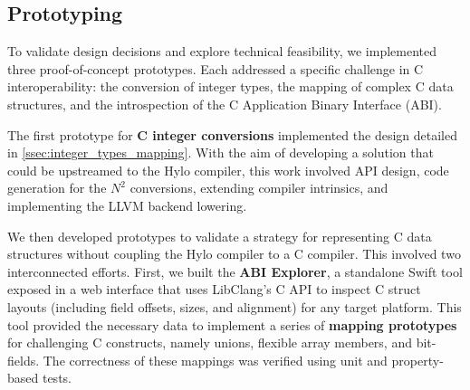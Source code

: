 \subsection{Prototyping}
To validate design decisions and explore technical feasibility, we implemented three proof-of-concept prototypes. Each addressed a specific challenge in C interoperability: the conversion of integer types, the mapping of complex C data structures, and the introspection of the C Application Binary Interface (ABI).

The first prototype for \textbf{C integer conversions} implemented the design detailed in \autoref{ssec:integer_types_mapping}. With the aim of developing a solution that could be upstreamed to the Hylo compiler, this work involved API design, code generation for the $N^2$ conversions, extending compiler intrinsics, and implementing the LLVM backend lowering.

We then developed prototypes to validate a strategy for representing C data structures without coupling the Hylo compiler to a C compiler. This involved two interconnected efforts. First, we built the \textbf{ABI Explorer}, a standalone Swift tool exposed in a web interface\cite{abi-explorer} that uses LibClang's C API to inspect C struct layouts (including field offsets, sizes, and alignment) for any target platform. This tool provided the necessary data to implement a series of \textbf{mapping prototypes} for challenging C constructs, namely unions\cite{hylo-union-mapping}, flexible array members\cite{hylo-fam-mapping}, and bit-fields\cite{hylo-bit-field-mapping}. The correctness of these mappings was verified using unit and property-based tests.